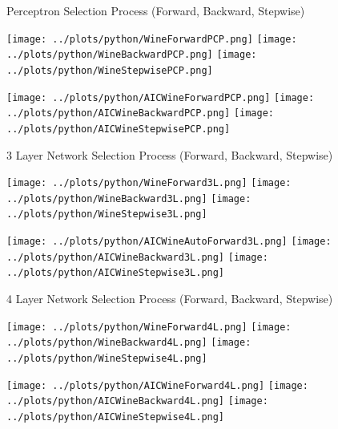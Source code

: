 \documentclass{article}
\begin{document}
	Perceptron Selection Process (Forward, Backward, Stepwise)
	
	\texttt{[image: ../plots/python/WineForwardPCP.png]} 
	\texttt{[image: ../plots/python/WineBackwardPCP.png]}
	\texttt{[image: ../plots/python/WineStepwisePCP.png]}
	
	\texttt{[image: ../plots/python/AICWineForwardPCP.png]} 
	\texttt{[image: ../plots/python/AICWineBackwardPCP.png]}
	\texttt{[image: ../plots/python/AICWineStepwisePCP.png]}
	
	3 Layer Network Selection Process (Forward, Backward, Stepwise)
	
	\texttt{[image: ../plots/python/WineForward3L.png]} 
	\texttt{[image: ../plots/python/WineBackward3L.png]}
	\texttt{[image: ../plots/python/WineStepwise3L.png]}
	
	\texttt{[image: ../plots/python/AICWineAutoForward3L.png]} 
	\texttt{[image: ../plots/python/AICWineBackward3L.png]}
	\texttt{[image: ../plots/python/AICWineStepwise3L.png]}
	
	4 Layer Network Selection Process (Forward, Backward, Stepwise)
	
	\texttt{[image: ../plots/python/WineForward4L.png]} 
	\texttt{[image: ../plots/python/WineBackward4L.png]}
	\texttt{[image: ../plots/python/WineStepwise4L.png]}
	
	\texttt{[image: ../plots/python/AICWineForward4L.png]} 
	\texttt{[image: ../plots/python/AICWineBackward4L.png]}
	\texttt{[image: ../plots/python/AICWineStepwise4L.png]}
	
	
\end{document}
